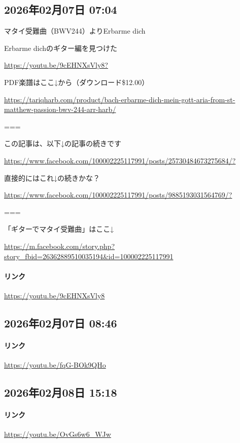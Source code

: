 \subsection*{2026年02月07日 07:04}

マタイ受難曲（BWV244）よりErbarme dich

Erbarme dichのギター編を見つけた

\url{https://youtu.be/9cEHNXsVly8?}

PDF楽譜はここ↓から（ダウンロード\$12.00）

\url{https://tariqharb.com/product/bach-erbarme-dich-mein-gott-aria-from-st-matthew-passion-bwv-244-arr-harb/}

===

この記事は、以下↓の記事の続きです

\url{https://www.facebook.com/100002225117991/posts/25730484673275684/?}

直接的にはこれ↓の続きかな？

\url{https://www.facebook.com/100002225117991/posts/9885193031564769/?}

===

「ギターでマタイ受難曲」はここ↓

\url{https://m.facebook.com/story.php?story_fbid=26362889510035194&id=100002225117991}

\paragraph{リンク}
\url{https://youtu.be/9cEHNXsVly8}

\subsection*{2026年02月07日 08:46}

\paragraph{リンク}
\url{https://youtu.be/fqG-BOk9QHo}

\subsection*{2026年02月08日 15:18}

\paragraph{リンク}
\url{https://youtu.be/OvGs6w6_WJw}

